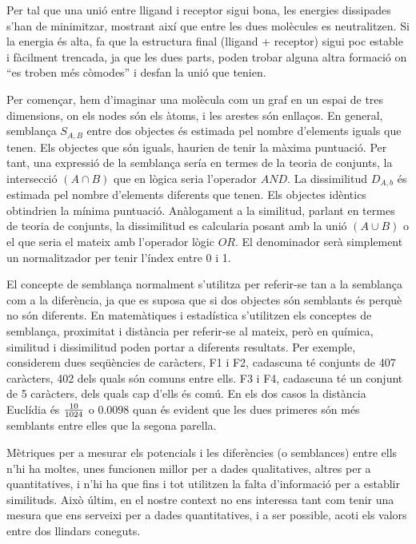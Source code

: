 Per tal que una unió entre lligand i receptor sigui bona, les energies
dissipades s'han de minimitzar, mostrant així que entre les dues molècules es
neutralitzen.  Si la energia és alta, fa que la estructura final (lligand +
receptor) sigui poc estable i fàcilment trencada, ja que les dues parts, poden
trobar alguna altra formació on ``es troben més còmodes'' i desfan la unió que
tenien.


Per començar, hem d'imaginar una molècula com un graf en un espai de tres
dimensions, on els nodes són els àtoms, i les arestes són enllaços.  En general,
semblança $S_{A,B}$ entre dos objectes és estimada pel nombre d'elements iguals
que tenen. Els objectes que són iguals, haurien de tenir la màxima puntuació.
Per tant, una expressió de la semblança sería en termes de la teoria de
conjunts, la intersecció $(A\cap B)$ que en lògica seria l'operador $AND$. La
dissimilitud $D_{A,b}$ és estimada pel nombre d'elements diferents que tenen.
Els objectes idèntics obtindrien la mínima puntuació. Anàlogament a la
similitud, parlant en termes de teoria de conjunts, la dissimilitud es
calcularia posant amb la unió $(A\cup B)$ o el que seria el mateix amb
l'operador lògic $OR$. El denominador serà simplement un normalitzador per tenir
l'índex entre 0 i 1. 

El concepte de semblança normalment s'utilitza per referir-se tan a la semblança
com a la diferència, ja que es suposa que si dos objectes són semblants és
perquè no són diferents. En matemàtiques i estadística s'utilitzen els conceptes
de semblança, proximitat i distància per referir-se al mateix, però en química,
similitud i dissimilitud poden portar a diferents resultats. Per exemple,
considerem dues seqüències de caràcters, F1 i F2, cadascuna té conjunts de 407
caràcters, 402 dels quals són comuns entre ells. F3 i F4, cadascuna té un
conjunt de 5 caràcters, dels quals cap d'ells és comú. En els dos casos la
distància Euclídia és $10 \over 1024$  o $0.0098$ quan és evident que les dues
primeres són més semblants entre elles que la segona parella.

Mètriques per a mesurar els potencials i les diferències (o semblances) entre
ells n'hi ha moltes, unes funcionen millor per a dades qualitatives, altres per
a quantitatives, i n'hi ha que fins i tot utilitzen la falta d'informació per a
establir similituds.  Això últim, en el nostre context no ens interessa tant com
tenir una mesura que ens serveixi per a dades quantitatives, i a ser possible,
acoti els valors entre dos llindars coneguts.

